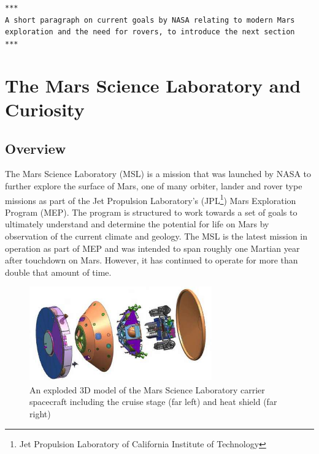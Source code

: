       \texttt{***\\
      A short paragraph on current goals by NASA relating to modern Mars exploration and the need for rovers, to introduce the next section\\
      ***}
      
    
  \section{The Mars Science Laboratory and Curiosity}
    \subsection{Overview}
      The Mars Science Laboratory (MSL) is a mission that was launched by NASA to further explore the surface of Mars, one of many orbiter, lander and rover type missions as part of the Jet Propulsion Laboratory's (JPL\footnote{Jet Propulsion Laboratory of California Institute of Technology}) Mars Exploration Program (MEP). The program is structured to work towards a set of goals to ultimately understand and determine the potential for life on Mars \cite{meptheme} by observation of the current climate and geology. The MSL is the latest mission in operation as part of MEP and was intended to span roughly one Martian year after touchdown on Mars. However, it has continued to operate for more than double that amount of time. 
      
      \begin{figure}[ht]
        \centering
        \includegraphics[width=0.7\textwidth]{figures/mslSpacecraftExplodedView.jpg}
        \caption[An exploded 3D model of the Mars Science Laboratory carrier spacecraft including the cruise stage (far left) and heat shield (far right)]{An exploded 3D model of the Mars Science Laboratory carrier spacecraft including the cruise stage (far left) and heat shield (far right) \cite{fig:mslSpacecraftExplodedView_cite}}
        \label{fig:mslSpacecraftExplodedView}
      \end{figure}
      
